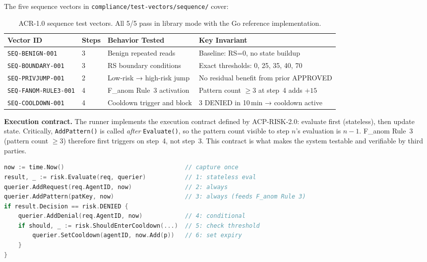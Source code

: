 \documentclass[11pt]{article}
\theoremstyle{definition}
\begin{document}
The five sequence vectors in \texttt{compliance/test-vectors/sequence/} cover:

\begin{table}[h!]
\centering
\small
\begin{tabular}{@{}llll@{}}
\toprule
\textbf{Vector ID} & \textbf{Steps} & \textbf{Behavior Tested} & \textbf{Key Invariant} \\
\midrule
\texttt{SEQ-BENIGN-001}         & 3 & Benign repeated reads          & Baseline: RS=0, no state buildup \\
\texttt{SEQ-BOUNDARY-001}       & 3 & RS boundary conditions          & Exact thresholds: 0, 25, 35, 40, 70 \\
\texttt{SEQ-PRIVJUMP-001}       & 2 & Low-risk → high-risk jump       & No residual benefit from prior APPROVED \\
\texttt{SEQ-FANOM-RULE3-001}    & 4 & F\_anom Rule~3 activation       & Pattern count $\geq 3$ at step~4 adds $+15$ \\
\texttt{SEQ-COOLDOWN-001}       & 4 & Cooldown trigger and block      & 3 DENIED in 10\,min → cooldown active \\
\bottomrule
\end{tabular}
\caption{ACR-1.0 sequence test vectors. All 5/5 pass in library mode with the Go reference implementation.}
\end{table}

\noindent\textbf{Execution contract.}
The runner implements the execution contract defined by ACP-RISK-2.0:
evaluate first (stateless), then update state.
Critically, \texttt{AddPattern()} is called \emph{after} \texttt{Evaluate()},
so the pattern count visible to step $n$'s evaluation is $n-1$.
F\_anom Rule~3 (pattern count $\geq 3$) therefore first triggers on step~4, not step~3.
This contract is what makes the system testable and verifiable by third parties.

\begin{lstlisting}[language=Go, caption={ACR-1.0 execution contract in library mode.}]
now := time.Now()                                  // capture once
result, _ := risk.Evaluate(req, querier)           // 1: stateless eval
querier.AddRequest(req.AgentID, now)               // 2: always
querier.AddPattern(patKey, now)                    // 3: always (feeds F_anom Rule 3)
if result.Decision == risk.DENIED {
    querier.AddDenial(req.AgentID, now)            // 4: conditional
    if should, _ := risk.ShouldEnterCooldown(...)  // 5: check threshold
        querier.SetCooldown(agentID, now.Add(p))   // 6: set expiry
    }
}
\end{lstlisting}
\end{document}
